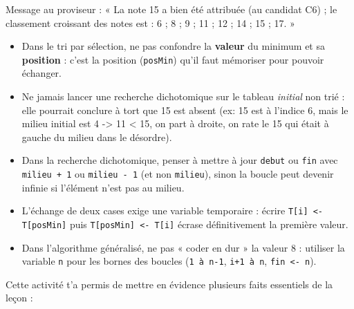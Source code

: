 \documentclass[11pt]{article}
\newcounter{popsec}
\newcounter{popsub}
\newcommand{\courssub}[1]{%
  \stepcounter{popsub}%
  \par\vspace{9pt}\noindent{\popxbold\fontsize{11.5}{13}\selectfont\color{popink}{\color{poporange}\thepopsec.\thepopsub}\hspace{6pt}#1}\par\nopagebreak\vspace{4pt}
}
\begin{document}
\begin{exoresolu}
Message au proviseur : « La note 15 a bien été attribuée (au candidat C6) ; le classement croissant des notes est : 6 ; 8 ; 9 ; 11 ; 12 ; 14 ; 15 ; 17. »
\end{exoresolu}

\begin{attention}
\begin{itemize}
\item Dans le tri par sélection, ne pas confondre la \textbf{valeur} du minimum et sa \textbf{position} : c'est la position (\texttt{posMin}) qu'il faut mémoriser pour pouvoir échanger.
\item Ne jamais lancer une recherche dichotomique sur le tableau \emph{initial} non trié : elle pourrait conclure à tort que 15 est absent (ex: 15 est à l'indice 6, mais le milieu initial est 4 -> 11 < 15, on part à droite, on rate le 15 qui était à gauche du milieu dans le désordre).
\item Dans la recherche dichotomique, penser à mettre à jour \texttt{debut} ou \texttt{fin} avec \texttt{milieu + 1} ou \texttt{milieu - 1} (et non \texttt{milieu}), sinon la boucle peut devenir infinie si l'élément n'est pas au milieu.
\item L'échange de deux cases exige une variable temporaire : écrire \texttt{T[i] <- T[posMin]} puis \texttt{T[posMin] <- T[i]} écrase définitivement la première valeur.
\item Dans l'algorithme généralisé, ne pas « coder en dur » la valeur 8 : utiliser la variable \texttt{n} pour les bornes des boucles (\texttt{1 à n-1}, \texttt{i+1 à n}, \texttt{fin <- n}).
\end{itemize}
\end{attention}

\courssub{Bilan de l'activité}

Cette activité t'a permis de mettre en évidence plusieurs faits essentiels de la leçon :
\end{document}
